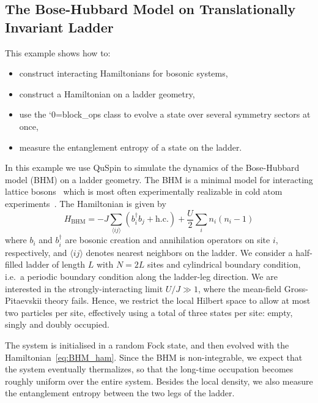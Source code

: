 \documentclass{SciPost}
\newcommand\0{\scalebox{-1}[1]{0}}
\let\svttfamily\ttfamily
\renewcommand\ttfamily{\svttfamily\catcode`0=\active }
\renewcommand\texttt{\bgroup\ttfamily\texttthelp}
\def\texttthelp#1{#1\egroup}
\begin{document}
\subsection{The Bose-Hubbard Model on Translationally Invariant Ladder}
\label{subsec:Bose_Ladder}

This example shows how to:
\begin{itemize}
	\item construct interacting Hamiltonians for bosonic systems,
	\item construct a Hamiltonian on a ladder geometry,
	\item use the \texttt{block\_ops} class to evolve a state over several symmetry sectors at once,
	\item measure the entanglement entropy of a state on the ladder.
\end{itemize}

 In this example we use QuSpin to simulate the dynamics of the Bose-Hubbard model (BHM) on a ladder geometry. The BHM is a minimal model for interacting lattice bosons~\cite{sachdev_book} which is most often experimentally realizable in cold atom experiments~\cite{bloch_05}. The Hamiltonian is given by
\begin{equation}
	H_\mathrm{BHM} = -J\sum_{\langle ij\rangle} \left(b_i^\dagger b_j + \mathrm{h.c.}\right) + \frac{U}{2}\sum_{i}n_i(n_i-1)
	\label{eq:BHM_ham}
\end{equation} 
where $b_i$ and $b^\dagger_i$ are bosonic creation and annihilation operators on site $i$, respectively, and $\langle ij\rangle$ denotes nearest neighbors on the ladder. We consider a half-filled ladder of length $L$ with $N=2L$ sites and cylindrical boundary condition, i.e.~a periodic boundary condition along the ladder-leg direction. We are interested in the strongly-interacting limit $U/J\gg 1$, where the mean-field Gross-Pitaevskii theory fails. Hence, we restrict the local Hilbert space to allow at most two particles per site, effectively using a total of three states per site: empty, singly and doubly occupied.  

The system is initialised in a random Fock state, and then evolved with the Hamiltonian~\eqref{eq:BHM_ham}.  Since the BHM is non-integrable, we expect that the system eventually thermalizes, so that the long-time occupation becomes roughly uniform over the entire system. Besides the local density, we also measure the entanglement entropy between the two legs of the ladder.
\end{document}
